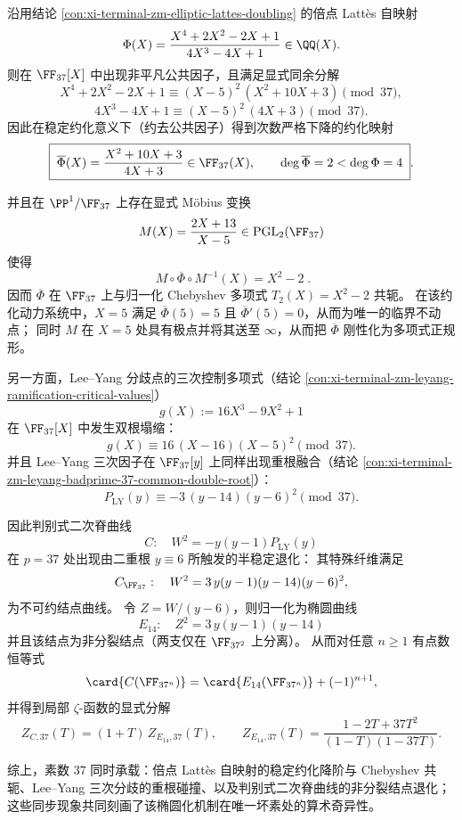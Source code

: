 \begin{conclusion}\label{con:xi-terminal-zm-elliptic-lattes-badprime-37-degree-drop}
沿用结论 \ref{con:xi-terminal-zm-elliptic-lattes-doubling} 的倍点 Latt\`es 自映射
\[
\Phi(X)=\frac{X^4+2X^2-2X+1}{4X^3-4X+1}\in\QQ(X).
\]
则在 \(\FF_{37}[X]\) 中出现非平凡公共因子，且满足显式同余分解
\[
X^4+2X^2-2X+1\equiv (X-5)^2\,(X^2+10X+3)\pmod{37},
\]
\[
4X^3-4X+1\equiv (X-5)^2\,(4X+3)\pmod{37}.
\]
因此在稳定约化意义下（约去公共因子）得到次数严格下降的约化映射
\[
\boxed{\;
\overline{\Phi}(X)=\frac{X^2+10X+3}{4X+3}\in\FF_{37}(X),\qquad \deg\overline{\Phi}=2<\deg\Phi=4\; } .
\]
\par
并且在 \(\PP^{1}/\FF_{37}\) 上存在显式 Möbius 变换
\[
M(X)=\frac{2X+13}{X-5}\in \mathrm{PGL}_{2}(\FF_{37})
\]
使得
\[
\boxed{\;
M\circ \overline{\Phi}\circ M^{-1}(X)=X^{2}-2\; } .
\]
因而 \(\overline{\Phi}\) 在 \(\FF_{37}\) 上与归一化 Chebyshev 多项式 \(T_{2}(X)=X^{2}-2\) 共轭。
在该约化动力系统中，\(X=5\) 满足 \(\overline{\Phi}(5)=5\) 且 \(\overline{\Phi}'(5)=0\)，从而为唯一的临界不动点；
同时 \(M\) 在 \(X=5\) 处具有极点并将其送至 \(\infty\)，从而把 \(\overline{\Phi}\) 刚性化为多项式正规形。
\par
另一方面，Lee--Yang 分歧点的三次控制多项式（结论 \ref{con:xi-terminal-zm-leyang-ramification-critical-values}）
\[
g(X):=16X^3-9X^2+1
\]
在 \(\FF_{37}[X]\) 中发生双根塌缩：
\[
g(X)\equiv 16\,(X-16)(X-5)^2\pmod{37}.
\]
并且 Lee--Yang 三次因子在 \(\FF_{37}[y]\) 上同样出现重根融合（结论 \ref{con:xi-terminal-zm-leyang-badprime-37-common-double-root}）：
\[
P_{\mathrm{LY}}(y)\equiv -3\,(y-14)(y-6)^2\pmod{37}.
\]
\par
因此判别式二次脊曲线
\[
C:\quad W^{2}=-y(y-1)P_{\mathrm{LY}}(y)
\]
在 \(p=37\) 处出现由二重根 \(y\equiv 6\) 所触发的半稳定退化：
其特殊纤维满足
\[
C_{\FF_{37}}:\quad W^{2}=3\,y(y-1)(y-14)(y-6)^{2},
\]
为不可约结点曲线。
令 \(Z=W/(y-6)\)，则归一化为椭圆曲线
\[
E_{14}:\quad Z^{2}=3\,y(y-1)(y-14)
\]
并且该结点为非分裂结点（两支仅在 \(\FF_{37^{2}}\) 上分离）。
从而对任意 \(n\ge 1\) 有点数恒等式
\[
\card{C(\FF_{37^{n}})}=\card{E_{14}(\FF_{37^{n}})}+(-1)^{n+1},
\]
并得到局部 \(\zeta\)-函数的显式分解
\[
Z_{C,37}(T)=(1+T)\,Z_{E_{14},37}(T),\qquad
Z_{E_{14},37}(T)=\frac{1-2T+37T^{2}}{(1-T)(1-37T)}.
\]
\par
综上，素数 \(37\) 同时承载：倍点 Latt\`es 自映射的稳定约化降阶与 Chebyshev 共轭、Lee--Yang 三次分歧的重根碰撞、以及判别式二次脊曲线的非分裂结点退化；
这些同步现象共同刻画了该椭圆化机制在唯一坏素处的算术奇异性。
\end{conclusion}
